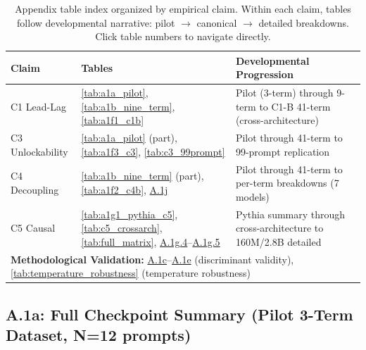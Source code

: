 \documentclass[10pt]{article} %
\begin{document}
\begin{table}[H]
\centering
\small
\begin{tabular}{|l|l|p{8cm}|}
\hline
\textbf{Claim} & \textbf{Tables} & \textbf{Developmental Progression} \\
\hline
C1 Lead-Lag & \ref{tab:a1a_pilot}, \ref{tab:a1b_nine_term}, \ref{tab:a1f1_c1b} & Pilot (3-term) through 9-term to C1-B 41-term (cross-architecture) \\
C3 Unlockability & \ref{tab:a1a_pilot} (part), \ref{tab:a1f3_c3}, \ref{tab:c3_99prompt} & Pilot through 41-term to 99-prompt replication \\
C4 Decoupling & \ref{tab:a1b_nine_term} (part), \ref{tab:a1f2_c4b}, \hyperref[sec:a1j_c4b]{A.1j} & Pilot through 41-term to per-term breakdowns (7 models) \\
C5 Causal & \ref{tab:a1g1_pythia_c5}, \ref{tab:c5_crossarch}, \ref{tab:full_matrix}, \hyperref[sec:a1g4_160m]{A.1g.4}--\hyperref[sec:a1g5_2b8]{A.1g.5} & Pythia summary through cross-architecture to 160M/2.8B detailed \\
\hline
\multicolumn{3}{|l|}{\textbf{Methodological Validation:} \hyperref[sec:a1c_v1v2]{A.1c}--\hyperref[sec:a1e_v4]{A.1e} (discriminant validity), \ref{tab:temperature_robustness} (temperature robustness)} \\
\hline
\end{tabular}
\caption{Appendix table index organized by empirical claim. Within each claim, tables follow developmental narrative: pilot $\to$ canonical $\to$ detailed breakdowns. Click table numbers to navigate directly.}
\label{tab:appendix_index}
\end{table}

\subsection*{A.1a: Full Checkpoint Summary (Pilot 3-Term Dataset, N=12 prompts)}
\end{document}
